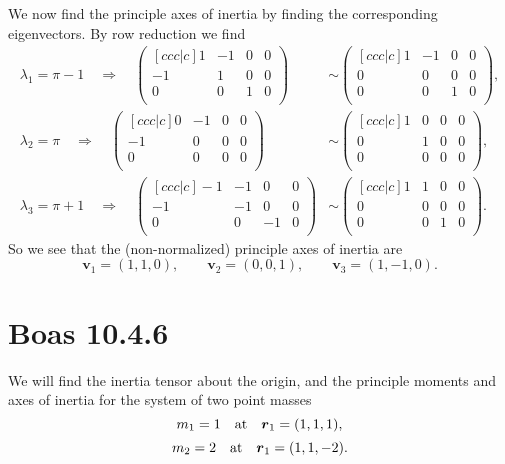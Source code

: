 \documentclass[a4paper, 11pt, titlepage, english]{article}
\newcommand{\To}{\quad\Rightarrow\quad}
\newcommand{\bt}[1]{\boldsymbol{#1}}
\begin{document}
We now find the principle axes of inertia by finding the corresponding eigenvectors. By row reduction we find
\begin{align*}
\lambda_1 = \pi-1 \To
\begin{pmatrix}[ccc|c]
1 & -1 &  0 &  0 \\
-1 &  1 & 0 &  0 \\
 0 & 0 &  1 & 0 \\
\end{pmatrix} &\sim
\begin{pmatrix}[ccc|c]
1 & -1 &  0 &  0 \\
0 &  0 & 0 &  0 \\
0 & 0 &  1 & 0 \\
\end{pmatrix},
\\
 \lambda_2 = \pi \To
\begin{pmatrix}[ccc|c]
0 & -1 &  0 &  0 \\
-1 &  0 & 0 &  0 \\
 0 & 0 & 0 & 0 \\
\end{pmatrix} &\sim
\begin{pmatrix}[ccc|c]
1 & 0 &  0 &  0 \\
0 &  1 & 0 &  0 \\
0 & 0 &  0 & 0 \\
\end{pmatrix},
\\
\lambda_3 = \pi+1 \To
\begin{pmatrix}[ccc|c]
-1 & -1 &  0 &  0 \\
-1 &  -1 & 0 &  0 \\
 0 & 0 &  -1 & 0 \\
\end{pmatrix} &\sim
\begin{pmatrix}[ccc|c]
1 & 1 &  0 &  0 \\
0 &  0 & 0 &  0 \\
0 & 0 &  1 & 0 \\
\end{pmatrix}.
\end{align*}
So we see that the (non-normalized) principle axes of inertia are
$$\bt{v}_1 = (1,1, 0), \qquad  \bt{v}_2 = (0,0, 1), \qquad \bt{v}_3 = (1,-1, 0).$$


\section*{Boas 10.4.6}
We will find the inertia tensor about the origin, and the principle moments and axes of inertia for the system of two point masses 
$$m_1 = 1 \quad {\rm at}\quad \bt{r}_1 = (1,1,1),$$
$$m_2 = 2 \quad {\rm at}\quad \bt{r}_1 = (1,1,-2).$$
\end{document}
